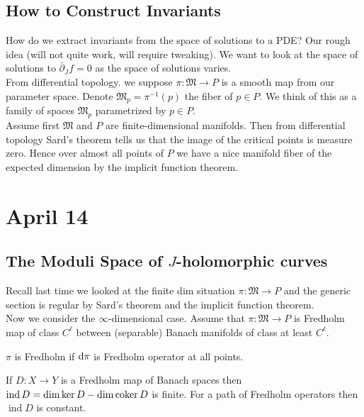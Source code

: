 \documentclass[12pt]{article}
\newcommand{\dbar}{\bar{\partial}}
\DeclareMathOperator{\ind}{\mathrm{ind}}
\begin{document}
\subsection{How to Construct Invariants}

\newcommand{\mf}[1]{\mathfrak{#1}}

How do we extract invariants from the space of solutions to a PDE? Our rough idea (will not quite work, will require tweaking). We want to look at the space of solutions to $\dbar_J f = 0$ as the space of solutions varies.
\bigskip\\
From differential topology. we suppose $\pi : \mf{M} \to P$ is a smooth map from our parameter space. Denote $\mf{M}_p = \pi^{-1}(p)$ the fiber of $p \in P$. We think of this as a family of spaces $\mf{M}_p$ parametrized by $p \in P$. 
\bigskip\\
Assume first $\mf{M}$ and $P$ are finite-dimensional manifolds. Then from differential topology Sard's theorem tells us that the image of the critical points is measure zero. Hence over almost all points of $P$ we have a nice manifold fiber of the expected dimension by the implicit function theorem.

\section{April 14}

\subsection{The Moduli Space of $J$-holomorphic curves}

Recall last time we looked at the finite dim situation $\pi : \mf{M} \to P$ and the generic section is regular by Sard's theorem and the implicit function theorem. 
\bigskip\\
Now we consider the $\infty$-dimensional case. Assume that $\pi : \mf{M} \to P$ is Fredholm map of class $C^\ell$ between (separable) Banach manifolds of class at least $C^\ell$.

\begin{defn}
$\pi$ is Fredholm if $\mathrm{d}{\pi}$ is Fredholm operator at all points. 
\end{defn}

\newcommand{\reg}{\mathrm{reg}}

\begin{rmk}
If $D : X \to Y$ is a Fredholm map of Banach spaces then $\ind{D} = \dim{\ker{D}} - \dim{\coker{D}}$ is finite. For a path of Fredholm operators then $\ind{D}$ is constant. 
\end{rmk}
\end{document}

